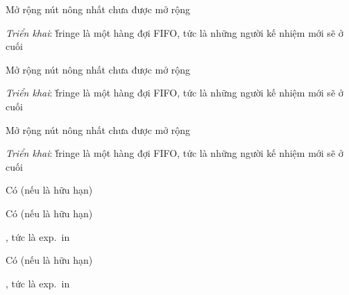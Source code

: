 \documentclass{article}
\begin{document}
\begin{huge}
Mở rộng nút nông nhất chưa được mở rộng

\emph{Triển khai}:\nl
\v{fringe} là một hàng đợi FIFO, tức là những người kế nhiệm mới sẽ ở cuối

\textwidth
{}


Mở rộng nút nông nhất chưa được mở rộng

\emph{Triển khai}:\nl
\v{fringe} là một hàng đợi FIFO, tức là những người kế nhiệm mới sẽ ở cuối

\textwidth
{}


Mở rộng nút nông nhất chưa được mở rộng

\emph{Triển khai}:\nl
\v{fringe} là một hàng đợi FIFO, tức là những người kế nhiệm mới sẽ ở cuối

\textwidth
{}





 Có (nếu  là hữu hạn)



 Có (nếu  là hữu hạn)

 , tức là exp.~in 



 Có (nếu  là hữu hạn)

 , tức là exp.~in 


\end{huge}
\end{document}

